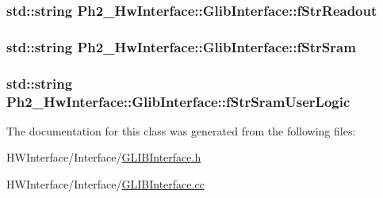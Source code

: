 \hypertarget{class_ph2___hw_interface_1_1_glib_interface_a925d65d022d0dc6d453e0e611826c377}{
\subsubsection[{f\-Str\-Readout}]{\setlength{\rightskip}{0pt plus 5cm}std\-::string Ph2\-\_\-\-Hw\-Interface\-::\-Glib\-Interface\-::f\-Str\-Readout\hspace{0.3cm}{\ttfamily [private]}}}\label{class_ph2___hw_interface_1_1_glib_interface_a925d65d022d0dc6d453e0e611826c377}
\hypertarget{class_ph2___hw_interface_1_1_glib_interface_a9e24a95e6ba16076ef8fbea1c96243f4}{
\subsubsection[{f\-Str\-Sram}]{\setlength{\rightskip}{0pt plus 5cm}std\-::string Ph2\-\_\-\-Hw\-Interface\-::\-Glib\-Interface\-::f\-Str\-Sram\hspace{0.3cm}{\ttfamily [private]}}}\label{class_ph2___hw_interface_1_1_glib_interface_a9e24a95e6ba16076ef8fbea1c96243f4}
\hypertarget{class_ph2___hw_interface_1_1_glib_interface_a27b44db1be7f8a3802ba1a5d675a9888}{
\subsubsection[{f\-Str\-Sram\-User\-Logic}]{\setlength{\rightskip}{0pt plus 5cm}std\-::string Ph2\-\_\-\-Hw\-Interface\-::\-Glib\-Interface\-::f\-Str\-Sram\-User\-Logic\hspace{0.3cm}{\ttfamily [private]}}}\label{class_ph2___hw_interface_1_1_glib_interface_a27b44db1be7f8a3802ba1a5d675a9888}


The documentation for this class was generated from the following files\-:\begin{DoxyCompactItemize}
\item 
H\-W\-Interface/\-Interface/\hyperlink{_g_l_i_b_interface_8h}{G\-L\-I\-B\-Interface.\-h}\item 
H\-W\-Interface/\-Interface/\hyperlink{_g_l_i_b_interface_8cc}{G\-L\-I\-B\-Interface.\-cc}\end{DoxyCompactItemize}
